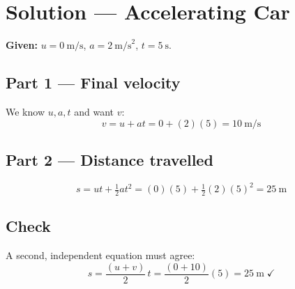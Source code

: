 
\section*{Solution --- Accelerating Car}

\textbf{Given:} $u = 0\ \text{m/s}$, \quad $a = 2\ \text{m/s}^{2}$,
\quad $t = 5\ \text{s}$.

\subsection*{Part 1 --- Final velocity}
We know $u, a, t$ and want $v$:
\begin{equation}
  v = u + at = 0 + (2)(5) = 10\ \text{m/s}
\end{equation}

\subsection*{Part 2 --- Distance travelled}
\begin{equation}
  s = ut + \tfrac{1}{2}at^{2}
    = (0)(5) + \tfrac{1}{2}(2)(5)^{2} = 25\ \text{m}
\end{equation}

\subsection*{Check}
A second, independent equation must agree:
\begin{equation}
  s = \frac{(u+v)}{2}\,t = \frac{(0+10)}{2}(5) = 25\ \text{m}\;\checkmark
\end{equation}

